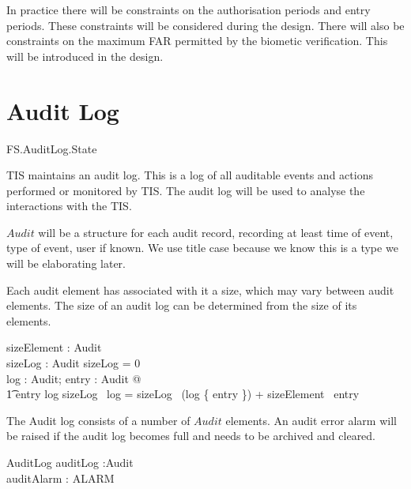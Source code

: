 In practice there will be constraints on the authorisation
periods and entry periods. These constraints will be considered during
the design. There will also be constraints on the maximum FAR
permitted by the biometic verification. This will be introduced in
the design.


\section{Audit Log}

\begin{traceunit}{FS.AuditLog.State}
\end{traceunit}

TIS maintains an audit log. This is a log of all auditable events and
actions performed or monitored by TIS. The audit log will be used to
analyse the interactions with the TIS.

$Audit$ will be a structure for each audit record, 
recording at least time of event, type of event, user if known.
We use title case because we know this is a type we will be elaborating later.
\begin{latezed}
	[ Audit ]
\end{latezed}

Each audit element has associated with it a size, which may vary
between audit elements. The size of an audit log can be determined
from the size of its elements.

\begin{axdef}
        sizeElement : Audit \fun \nat
\\      sizeLog : \finset Audit \fun \nat
\where
        sizeLog \emptyset = 0
\\      \forall log : \finset Audit; entry : Audit @
\\ \t1  entry \in log \implies sizeLog~ log = sizeLog~ (log
\setminus \{ entry \}) + sizeElement~ entry
\end{axdef}

The Audit log consists of a number of $Audit$ elements. 
An audit error alarm will be raised if the audit log becomes full and
needs to be archived and cleared.

\begin{schema}{AuditLog}
        auditLog :\finset Audit
\\      auditAlarm : ALARM
\end{schema}

